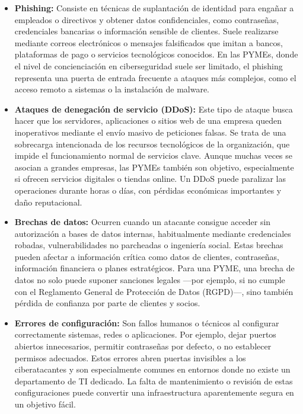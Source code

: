 \documentclass[a4paper, 10pt]{article}
\begin{document}
\begin{itemize}
    \item \textbf{Phishing:}  
    Consiste en técnicas de suplantación de identidad para engañar a empleados o directivos y obtener datos confidenciales, como contraseñas, credenciales bancarias o información sensible de clientes. Suele realizarse mediante correos electrónicos o mensajes falsificados que imitan a bancos, plataformas de pago o servicios tecnológicos conocidos. En las PYMEs, donde el nivel de concienciación en ciberseguridad suele ser limitado, el phishing representa una puerta de entrada frecuente a ataques más complejos, como el acceso remoto a sistemas o la instalación de malware.
    \vspace{0.3cm}

    \item \textbf{Ataques de denegación de servicio (DDoS):}  
    Este tipo de ataque busca hacer que los servidores, aplicaciones o sitios web de una empresa queden inoperativos mediante el envío masivo de peticiones falsas. Se trata de una sobrecarga intencionada de los recursos tecnológicos de la organización, que impide el funcionamiento normal de servicios clave. Aunque muchas veces se asocian a grandes empresas, las PYMEs también son objetivo, especialmente si ofrecen servicios digitales o tiendas online. Un DDoS puede paralizar las operaciones durante horas o días, con pérdidas económicas importantes y daño reputacional.
    \vspace{0.3cm}

    \item \textbf{Brechas de datos:}  
    Ocurren cuando un atacante consigue acceder sin autorización a bases de datos internas, habitualmente mediante credenciales robadas, vulnerabilidades no parcheadas o ingeniería social. Estas brechas pueden afectar a información crítica como datos de clientes, contraseñas, información financiera o planes estratégicos. Para una PYME, una brecha de datos no solo puede suponer sanciones legales —por ejemplo, si no cumple con el Reglamento General de Protección de Datos (RGPD)—, sino también pérdida de confianza por parte de clientes y socios.
    \vspace{0.3cm}

    \item \textbf{Errores de configuración:}  
    Son fallos humanos o técnicos al configurar correctamente sistemas, redes o aplicaciones. Por ejemplo, dejar puertos abiertos innecesarios, permitir contraseñas por defecto, o no establecer permisos adecuados. Estos errores abren puertas invisibles a los ciberatacantes y son especialmente comunes en entornos donde no existe un departamento de TI dedicado. La falta de mantenimiento o revisión de estas configuraciones puede convertir una infraestructura aparentemente segura en un objetivo fácil.

\end{itemize}
\end{document}

